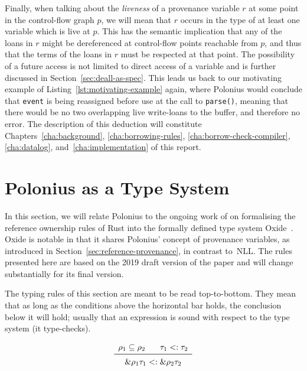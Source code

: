 \documentclass[11pt,a4paper,twoside,openany]{report}
\newcommand{\InRust}[1]{\texttt{#1}}
\newcommand{\ntyperule}[2]{\begin{array}{c}#1\\\midrule\raisebox{1pt}{\strut}#2\end{array}}
\renewcommand\_{\textunderscore\allowbreak}
\begin{document}
Finally, when talking about the \emph{liveness} of a provenance variable $r$ at
some point in the control-flow graph $p$, we will mean that $r$ occurs in the
type of at least one variable which is live at $p$. This has the semantic
implication that any of the loans in $r$ might be dereferenced at control-flow
points reachable from $p$, and thus that the terms of the loans in $r$ must be
respected at that point. The possibility of a future access is not limited to
direct access of a variable and is further discussed in
Section~\ref{sec:deall-as-spec}. This leads us back to our motivating example of
Listing~\ref{lst:motivating-example} again, where Polonius would conclude that
\InRust{event} is being reassigned before use at the call to \InRust{parse()},
meaning that there would be no two overlapping live write-loans to the buffer,
and therefore no error. The description of this deduction will constitute
Chapters~\ref{cha:background}, \ref{cha:borrowing-rules},
\ref{cha:borrow-check-compiler}, \ref{cha:datalog}, and~\ref{cha:implementation}
of this report.


\section{Polonius as a Type System}\label{sec:type-system}

In this section, we will relate Polonius to the ongoing work of
\citeauthor*{weiss_oxide:_2019} on formalising the reference ownership rules of
Rust into the formally defined type system Oxide~\cite{weiss_oxide:_2019}. Oxide
is notable in that it shares Polonius' concept of provenance variables, as
introduced in Section~\ref{sec:reference-provenance}, in contrast to~NLL\@. The
rules presented here are based on the 2019 draft version of the paper and will
change substantially for its final version.

The typing rules of this section are meant to be read top-to-bottom. They mean
that as long as the conditions above the horizontal bar holds, the conclusion
below it will hold; usually that an expression is sound with respect to the type
system (it type-checks).

\begin{equation}\label{eq:s-ref-baby}
  \ntyperule{
    \rho_1 \subseteq \rho_2 \:\:\:\:\:\:\:\:
    \tau_1 <: \tau_2
  }%
  {
    \&\rho_1 \tau_1 <: \&\rho_2 \tau_2
  }
\end{equation}
\end{document}
